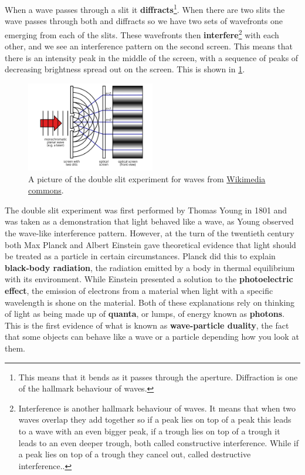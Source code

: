 \documentclass[a4paper,12pt]{book}
\begin{document}
When a wave passes through a slit it \textbf{diffracts}\footnote{This means that it bends as it passes through the aperture. Diffraction is one of the hallmark behaviour of waves.}. When there are two slits the wave passes through both and diffracts so we have two sets of wavefronts one emerging from each of the slits. These wavefronts then \textbf{interfere}\footnote{Interference is another hallmark behaviour of waves. It means that when two waves overlap they add together so if a peak lies on top of a peak this leads to a wave with an even bigger peak, if a trough lies on top of a trough it leads to an even deeper trough, both called constructive interference. While if a peak lies on top of a trough they cancel out, called destructive interference.. } with each other, and we see an interference pattern on the second screen. This means that there is an intensity peak in the middle of the screen, with a sequence of peaks of decreasing brightness spread out on the screen. This is shown in \cref{fig: double slit waves}.\\

\begin{figure}[ht]
    \centering
    \includegraphics[width=0.5\textwidth]{figures/Two-Slit_Experiment_Light.png}
    \caption{A picture of the double slit experiment for waves from \href{https://commons.wikimedia.org/wiki/File:Two-Slit_Experiment_Light.svg}{Wikimedia commons}.}
    \label{fig: double slit waves}
\end{figure}

The double slit experiment was first performed by Thomas Young in 1801 and was taken as a demonstration that light behaved like a wave, as Young observed the wave-like interference pattern. However, at the turn of the twentieth century both Max Planck and Albert Einstein gave theoretical evidence that light should be treated as a particle in certain circumstances. Planck did this to explain \textbf{black-body radiation}, the radiation emitted by a body in thermal equilibrium with its environment. While Einstein presented a solution to the \textbf{photoelectric effect}, the emission of electrons from a material when light with a specific wavelength is shone on the material. Both of these explanations rely on thinking of light as being made up of \textbf{quanta}, or lumps, of energy known as \textbf{photons}. This is the first evidence of what is known as \textbf{wave-particle duality}, the fact that some objects can behave like a wave or a particle depending how you look at them. \\
\end{document}
